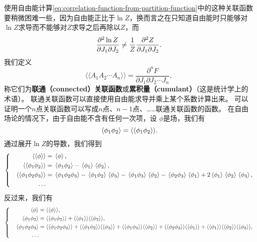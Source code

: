 \documentclass[hyperref, UTF8, a4paper]{ctexart}
\newcommand*{\cexpval}[1]{\langle \langle #1 \rangle \rangle}
\newenvironment{bigcase}{\left\{\quad\begin{aligned}}{\end{aligned}\right.}
\begin{document}
使用自由能计算\eqref{eq:correlation-function-from-partition-function}中的这种关联函数要稍微困难一些，因为自由能正比于$\ln Z$，换而言之在只知道自由能时只能够对$\ln Z$求导而不能够对$Z$求导之后再除以$Z$，而
\[
    \pdv[2]{\ln Z}{J_1}{J_2} \neq \frac{1}{Z} \pdv[2]{Z}{J_1}{J_2}.
\]
我们定义
\begin{equation}
    \cexpval{A_1 A_2 \cdots A_n} = \frac{\partial^n F}{\partial J_1 \partial J_2 \cdots J_n},
\end{equation}
称它们为\textbf{联通（connected）关联函数}或\textbf{累积量（cumulant）}（这是统计学上的术语）。
联通关联函数可以直接使用自由能求导并乘上某个系数计算出来。
可以证明一个$n$点关联函数可以写成$n$点、$n-1$点、……联通关联函数的函数。
在自由场论的情况下，由于自由能不含有任何一次项，设 $\phi$是场，我们有
\begin{equation}
    \expval*{\phi_1 \phi_2} = \cexpval{\phi_1 \phi_2}.
\end{equation}
通过展开$\ln Z$的导数，我们得到
\begin{equation}
    \begin{bigcase}
        \cexpval{\phi} &= \expval*{\phi}, \\
        \cexpval{\phi_1 \phi_2} &= \expval*{\phi_1 \phi_2} - \expval*{\phi_1} \expval*{\phi_2}, \\
        \cexpval{\phi_1 \phi_2 \phi_3} &= \expval*{\phi_1 \phi_2 \phi_3} - \expval*{\phi_1 \phi_2} \expval*{\phi_3} - \expval*{\phi_1 \phi_3} \expval*{\phi_2} - \expval*{\phi_2 \phi_3} \expval*{\phi_1} + 2\expval*{\phi_1} \expval*{\phi_2} \expval*{\phi_3}, \\
        \ldots
    \end{bigcase}
\end{equation}
反过来，我们有
\begin{equation}
    \begin{bigcase}
        \expval*{\phi} &= \cexpval{\phi}, \\
        \expval*{\phi_1 \phi_2} &= \cexpval{\phi_1 \phi_2} + \cexpval{\phi_1} \cexpval{\phi_2}, \\
        \expval*{\phi_1 \phi_2 \phi_3} &= \cexpval{\phi_1 \phi_2 \phi_3} + \cexpval{\phi_1 \phi_2} \cexpval{\phi_3} + \cexpval{\phi_1 \phi_3} \cexpval{\phi_2} + \cexpval{\phi_2 \phi_3} \cexpval{\phi_1} + \cexpval{\phi_1} \cexpval{\phi_2} \cexpval{\phi_3}, \\
        \ldots
    \end{bigcase}
\end{equation}
\end{document}
